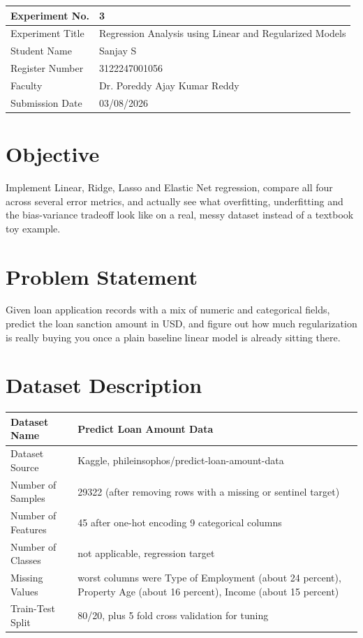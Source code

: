 \documentclass[12pt,a4paper]{article}
\begin{document}
\begin{tabular}{|p{4cm}|p{11cm}|}
\hline
Experiment No. & 3 \\ \hline
Experiment Title & Regression Analysis using Linear and Regularized Models\footnotemark \\ \hline
Student Name & Sanjay S \\ \hline
Register Number & 3122247001056 \\ \hline
Faculty & Dr. Poreddy Ajay Kumar Reddy \\ \hline
Submission Date & 03/08/2026 \\ \hline
\end{tabular}

\section{Objective}
Implement Linear, Ridge, Lasso and Elastic Net regression, compare all four across several error
metrics, and actually see what overfitting, underfitting and the bias-variance tradeoff look like on a
real, messy dataset instead of a textbook toy example.

\section{Problem Statement}
Given loan application records with a mix of numeric and categorical fields, predict the loan sanction
amount in USD, and figure out how much regularization is really buying you once a plain baseline linear
model is already sitting there.

\section{Dataset Description}
\begin{longtable}{|p{6cm}|p{8cm}|}
\hline
Dataset Name & Predict Loan Amount Data \\ \hline
Dataset Source & Kaggle, phileinsophos/predict-loan-amount-data \\ \hline
Number of Samples & 29322 (after removing rows with a missing or sentinel target) \\ \hline
Number of Features & 45 after one-hot encoding 9 categorical columns \\ \hline
Number of Classes & not applicable, regression target \\ \hline
Missing Values & worst columns were Type of Employment (about 24 percent), Property Age (about 16
percent), Income (about 15 percent) \\ \hline
Train-Test Split & 80/20, plus 5 fold cross validation for tuning \\ \hline
\end{longtable}
\end{document}
